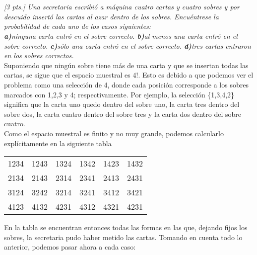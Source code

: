 \documentclass[11pt]{article}
\renewcommand{\(}{\left(}
\renewcommand{\)}{\right)}
\begin{document}
\section{}

\textit{[3 pts.] Una secretaria escribió a máquina cuatro cartas y cuatro sobres y por descuido insertó las cartas al azar dentro de los sobres. Encuéntrese la probabilidad de cada uno de los casos siguientes: \\ \textbf{a)}ninguna carta entró en el sobre correcto. \textbf{b)}al menos una carta entró en el sobre correcto. \textbf{c)}sólo una carta entró en el sobre correcto. \textbf{d)}tres cartas entraron en los sobres correctos.} \\

Suponiendo que ningún sobre tiene más de una carta y que se insertan todas las cartas, se sigue que el espacio muestral es $4!$. Esto es debido a que podemos ver el problema como una selección de 4, donde cada posición corresponde a los sobres marcados con 1,2,3 y 4; respectivamente. Por ejemplo, la selección \{1,3,4,2\} significa que la carta uno quedo dentro del sobre uno, la carta tres dentro del sobre dos, la carta cuatro dentro del sobre tres y la carta dos dentro del sobre cuatro. \\
Como el espacio muestral es finito y no muy grande, podemos calcularlo explícitamente en la siguiente tabla

\begin{center}
	\begin{tabular}{||c c c c c c||} 
	\hline 
	1234 & 1243 & 1324 & 1342 & 1423 & 1432 \\
	2134 & 2143 & 2314 & 2341 & 2413 & 2431 \\
	3124 & 3242 & 3214 & 3241 & 3412 & 3421 \\
	4123 & 4132 & 4231 & 4312 & 4321 & 4231 \\
	\hline
	\end{tabular}
\end{center}

En la tabla se encuentran entonces todas las formas en las que, dejando fijos los sobres, la secretaria pudo haber metido las cartas. Tomando en cuenta todo lo anterior, podemos pasar ahora a cada caso:
\end{document}
